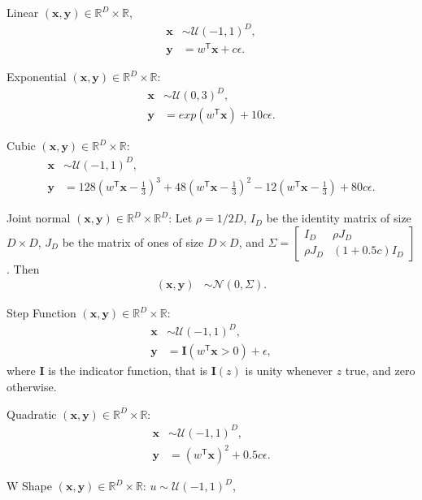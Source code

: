 \documentclass[11pt]{article}
\providecommand{\mb}[1]{\boldsymbol{#1}}
\providecommand{\mc}[1]{\mathcal{#1}}
\newcommand{\Real}{\mathbb{R}}
\newcommand{\T}{^{\ensuremath{\mathsf{T}}}}           %
\begin{document}
\setcounter{equation}{0}
\begin{compactenum}
\item Linear $(\mb{x},\mb{y}) \in \Real^{D} \times \Real$,
\begin{align*}
\mb{x} &\sim \mc{U}(-1,1)^{D},\\
\mb{y} &=w\T \mb{x}+c\epsilon.
\end{align*}
\item Exponential $(\mb{x},\mb{y}) \in \Real^{D} \times \Real$:
\begin{align*}
\mb{x} &\sim \mc{U}(0,3)^{D}, \\
\mb{y} &=exp(w\T \mb{x})+10c\epsilon.
\end{align*}
\item Cubic $(\mb{x},\mb{y}) \in \Real^{D} \times \Real$:
\begin{align*}
\mb{x} &\sim \mc{U}(-1,1)^{D}, \\
\mb{y} &=128(w\T \mb{x}-\tfrac{1}{3})^3+48(w\T \mb{x}-\tfrac{1}{3})^2-12(w\T \mb{x}-\tfrac{1}{3})+80c\epsilon.
\end{align*}
\item Joint normal $(\mb{x},\mb{y}) \in \Real^{D} \times \Real^{D}$: Let $\rho=1/2D$, $I_{D}$ be the identity matrix of size $D \times D$, $J_{D}$ be the matrix of ones of size $D \times D$, and $\Sigma = \begin{bmatrix} I_{D}&\rho J_{D}\\ \rho J_{D}& (1+0.5c) I_{D} \end{bmatrix}$. Then
\begin{align*}
(\mb{x}, \mb{y}) &\sim \mc{N}(0, \Sigma). 
\end{align*}
\item Step Function $(\mb{x},\mb{y}) \in \Real^{D} \times \Real$:
\begin{align*}
\mb{x} &\sim \mc{U}(-1,1)^{D},\\
\mb{y} &=\mb{I}(w\T \mb{x}>0)+\epsilon,
\end{align*}
where $\mb{I}$ is the indicator function, that is $\mb{I}(z)$ is unity whenever $z$ true, and zero otherwise.
\item Quadratic $(\mb{x},\mb{y}) \in \Real^{D} \times \Real$:
\begin{align*}
\mb{x} &\sim \mc{U}(-1,1)^{D},\\
\mb{y}&=(w\T \mb{x})^2+0.5c\epsilon.
\end{align*}
\item W Shape $(\mb{x},\mb{y}) \in \Real^{D} \times \Real$:  $u \sim \mc{U}(-1,1)^{D}$,
\begin{align*}

\end{align*}
\end{compactenum}
\end{document}
